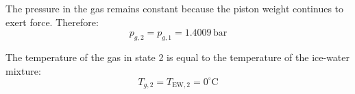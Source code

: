 The pressure in the gas remains constant because the piston weight continues to exert force. Therefore:  
\[
p_{g,2} = p_{g,1} = 1.4009 \, \text{bar}
\]  

The temperature of the gas in state 2 is equal to the temperature of the ice-water mixture:  
\[
T_{g,2} = T_{\text{EW},2} = 0^\circ\text{C}
\]